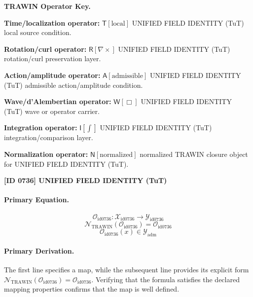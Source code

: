 \par\vspace{0.45\baselineskip}
\noindent\begin{minipage}[t]{\linewidth}
\begingroup
\small
\raggedright
\textbf{TRAWIN Operator Key.}\par
\noindent\textbf{Time/localization operator:} $\mathsf{T}\!\left[\mathrm{local}\right]$ UNIFIED FIELD IDENTITY (TuT) local source condition.\par
\noindent\textbf{Rotation/curl operator:} $\mathsf{R}\!\left[\nabla\times\right]$ UNIFIED FIELD IDENTITY (TuT) rotation/curl preservation layer.\par
\noindent\textbf{Action/amplitude operator:} $\mathsf{A}\!\left[\mathrm{admissible}\right]$ UNIFIED FIELD IDENTITY (TuT) admissible action/amplitude condition.\par
\noindent\textbf{Wave/d'Alembertian operator:} $\mathsf{W}\!\left[\Box\right]$ UNIFIED FIELD IDENTITY (TuT) wave or operator carrier.\par
\noindent\textbf{Integration operator:} $\mathsf{I}\!\left[\int\right]$ UNIFIED FIELD IDENTITY (TuT) integration/comparison layer.\par
\noindent\textbf{Normalization operator:} $\mathsf{N}\!\left[\mathrm{normalized}\right]$ normalized TRAWIN closure object for UNIFIED FIELD IDENTITY (TuT).\par
\endgroup
\end{minipage}

\clearpage
\noindent\textbf{[ID 0736] UNIFIED FIELD IDENTITY (TuT)}\par
\vspace{0.35em}
\paragraph{Primary Equation.}
\[
\mathcal{O}_{\mathrm{id0736}}:\mathcal{X}_{\mathrm{id0736}}\longrightarrow\mathcal{Y}_{\mathrm{id0736}}
\]
\[
\mathcal{N}_{\mathrm{TRAWIN}}(\mathcal{O}_{\mathrm{id0736}})=\mathcal{O}_{\mathrm{id0736}}
\]
\[
\mathcal{O}_{\mathrm{id0736}}(x)\in\mathcal{Y}_{\mathrm{adm}}
\]

\paragraph{Primary Derivation.}
The first line specifies a map, while the subsequent line provides its explicit form \( \mathcal{N}_{\mathrm{TRAWIN}}(\mathcal{O}_{\mathrm{id0736}})=\mathcal{O}_{\mathrm{id0736}} \). Verifying that the formula satisfies the declared mapping properties confirms that the map is well defined.
